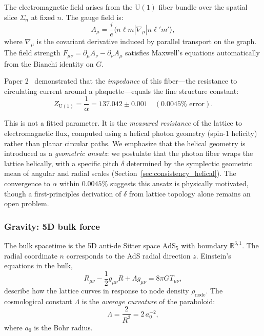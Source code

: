 \documentclass[aps,prd,twocolumn,superscriptaddress,groupedaddress,showpacs]{revtex4-2}
\newcommand{\U}{\ensuremath{\text{U}}}
\begin{document}
The electromagnetic field arises from the $\U(1)$ fiber bundle over the spatial slice $\Sigma_n$ at fixed $n$. The gauge field is:
\begin{equation}
A_\mu = \frac{i}{e} \langle n\ell m | \nabla_\mu | n\ell' m' \rangle,
\end{equation}
where $\nabla_\mu$ is the covariant derivative induced by parallel transport on the graph. The field strength $F_{\mu\nu} = \partial_\mu A_\nu - \partial_\nu A_\mu$ satisfies Maxwell's equations automatically from the Bianchi identity on $G$.

Paper 2~\cite{Louthan_II} demonstrated that the \emph{impedance} of this fiber---the resistance to circulating current around a plaquette---equals the fine structure constant:
\begin{equation}
Z_{\U(1)} = \frac{1}{\alpha} = 137.042 \pm 0.001 \quad (0.0045\% \text{ error}).
\end{equation}

This is not a fitted parameter. It is the \emph{measured resistance} of the lattice to electromagnetic flux, computed using a helical photon geometry (spin-1 helicity) rather than planar circular paths. We emphasize that the helical geometry is introduced as a \emph{geometric ansatz}: we postulate that the photon fiber wraps the lattice helically, with a specific pitch $\delta$ determined by the symplectic geometric mean of angular and radial scales (Section~\ref{sec:consistency_helical}). The convergence to $\alpha$ within $0.0045\%$ suggests this ansatz is physically motivated, though a first-principles derivation of $\delta$ from lattice topology alone remains an open problem.

\subsubsection{Gravity: 5D bulk force}

The bulk spacetime is the 5D anti-de Sitter space $\text{AdS}_5$ with boundary $\mathbb{R}^{3,1}$. The radial coordinate $n$ corresponds to the AdS radial direction $z$. Einstein's equations in the bulk,
\begin{equation}
R_{\mu\nu} - \frac{1}{2} g_{\mu\nu} R + \Lambda g_{\mu\nu} = 8\pi G T_{\mu\nu},
\end{equation}
describe how the lattice curves in response to node density $\rho_{\text{node}}$. The cosmological constant $\Lambda$ is the \emph{average curvature} of the paraboloid:
\begin{equation}
\Lambda = \frac{2}{R^2} = 2 \, a_0^{-2},
\end{equation}
where $a_0$ is the Bohr radius.
\end{document}
